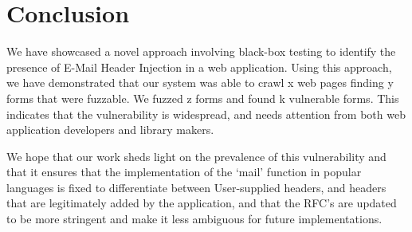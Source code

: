 \chapter{Conclusion}
We have showcased a novel approach involving black-box testing to identify the presence of E-Mail Header Injection in a web application. Using this approach, we have demonstrated that our system was able to crawl {x} web pages finding {y} forms that were fuzzable. We fuzzed {z} forms and found {k} vulnerable forms. This indicates that the vulnerability is widespread, and needs attention from both web application developers and library makers. 

We hope that our work sheds light on the prevalence of this vulnerability and that it ensures that the implementation of the `mail' function in popular languages is fixed to differentiate between User-supplied headers, and headers that are legitimately added by the application, and that the RFC's are updated to be more stringent and make it less ambiguous for future implementations. 
